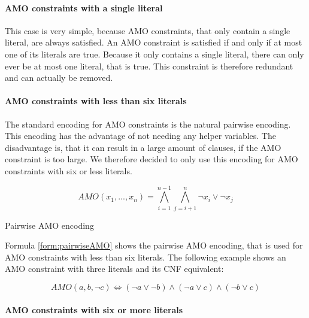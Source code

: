 \paragraph{AMO constraints with a single literal}

This case is very simple, because AMO constraints, that only contain a single literal, are always satisfied. An AMO constraint is satisfied if and only if at most one of its literals are true. Because it only contains a single literal, there can only ever be at most one literal, that is true. This constraint is therefore redundant and can actually be removed.

\paragraph{AMO constraints with less than six literals}

The standard encoding for AMO constraints is the natural pairwise encoding. This encoding has the advantage of not needing any helper variables. The disadvantage is, that it can result in a large amount of clauses, if the AMO constraint is too large. We therefore decided to only use this encoding for AMO constraints with six or less literals.

\begin{definition}[!htb]
\centering
\begin{leftbar}
\begin{displaymath}
AMO(x_1,...,x_n) = \bigwedge_{i=1}^{n - 1} \bigwedge_{j=i+1}^{n} \neg x_i \vee \neg x_j
\end{displaymath}
\end{leftbar}
\caption{Pairwise AMO encoding \cite{biere2009handbook}}
\label{form:pairwiseAMO}
\end{definition}

Formula \ref{form:pairwiseAMO} shows the pairwise AMO encoding, that is used for AMO constraints with less than six literals. The following example shows an AMO constraint with three literals and its CNF equivalent:

\begin{leftbar}
\begin{displaymath}
AMO(a,b,\neg c) \iff (\neg a \vee \neg b) \wedge (\neg a \vee c) \wedge (\neg b \vee c)
\end{displaymath}
\end{leftbar}

\paragraph{AMO constraints with six or more literals}

